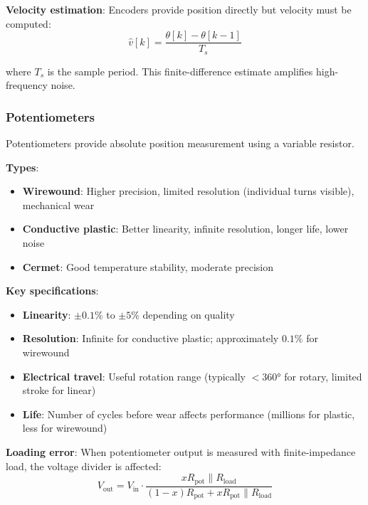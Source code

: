 \textbf{Velocity estimation}: Encoders provide position directly but velocity must be computed:
\begin{equation}
\hat{v}[k] = \frac{\theta[k] - \theta[k-1]}{T_s}
\label{eq:encoder_velocity}
\end{equation}

where $T_s$ is the sample period. This finite-difference estimate amplifies high-frequency noise.


\subsubsection{Potentiometers}

Potentiometers provide absolute position measurement using a variable resistor.

\textbf{Types}:
\begin{itemize}
    \item \textbf{Wirewound}: Higher precision, limited resolution (individual turns visible), mechanical wear
    \item \textbf{Conductive plastic}: Better linearity, infinite resolution, longer life, lower noise
    \item \textbf{Cermet}: Good temperature stability, moderate precision
\end{itemize}

\textbf{Key specifications}:
\begin{itemize}
    \item \textbf{Linearity}: $\pm 0.1\%$ to $\pm 5\%$ depending on quality
    \item \textbf{Resolution}: Infinite for conductive plastic; approximately $0.1\%$ for wirewound
    \item \textbf{Electrical travel}: Useful rotation range (typically $<360°$ for rotary, limited stroke for linear)
    \item \textbf{Life}: Number of cycles before wear affects performance (millions for plastic, less for wirewound)
\end{itemize}

\textbf{Loading error}: When potentiometer output is measured with finite-impedance load, the voltage divider is affected:
\begin{equation}
V_{\text{out}} = V_{\text{in}} \cdot \frac{xR_{\text{pot}} \parallel R_{\text{load}}}{(1-x)R_{\text{pot}} + xR_{\text{pot}} \parallel R_{\text{load}}}
\label{eq:pot_loading}
\end{equation}

